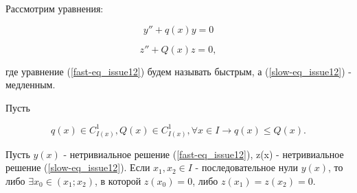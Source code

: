 \begin{theorem}

Рассмотрим уравнения:

\begin{equation}\label{fast-eq_issue12}
y'' + q(x) y = 0
\end{equation}

\begin{equation}\label{slow-eq_issue12}
z'' + Q(x)z = 0,
\end{equation}

где уравнение (\ref{fast-eq_issue12}) будем называть быстрым, а (\ref{slow-eq_issue12}) - медленным.

Пусть 

\[q(x)\in C^1_{I(x)}, Q(x) \in C^1_{I(x)}, \forall x \in I \rightarrow q(x) \leq Q(x).\]

Пусть $y(x)$ - нетривиальное решение (\ref{fast-eq_issue12}), z(x) - нетривиальное решение (\ref{slow-eq_issue12}). Если $x_1, x_2 \in I$ - последовательное нули $y(x)$, то либо $\exists x_0 \in (x_1;x_2)$, в которой $z(x_0) = 0$, либо $z(x_1) = z(x_2) = 0$.
\end{theorem}

